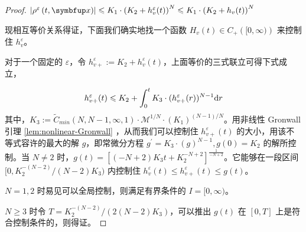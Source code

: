 \begin{proof}
        $\left| \rho^{\varepsilon} \left(t, \vx \right)\right| \leqslant K_{1} \cdot\left(K_{2}+h_{v}^{\varepsilon}(t)\right)^{N}\leqslant K_{1} \cdot\left(K_{2}+h_{v}(t)\right)^{N}$

现相互等价关系得证，下面我们确实地找一个函数 $H_v(t)\in C_+\left([0,\infty)\right)$ 来控制住 $h_v^\varepsilon$。





对于一个固定的 $\varepsilon$，令 $h_{v+}^\varepsilon:=K_2+h_v^\varepsilon(t)$，上面等价的三式联立可得下式成立，

\begin{equation}
h_{v+}^\varepsilon(t) \leqslant K_{2}+\int_{0}^{t} K_{3} \cdot(h_{v+}^\varepsilon(r))^{N-1} \mathrm{d} r \\
\end{equation}
其中，$K_{3}:=\tilde{C}_{min}(N, N-1, \infty, 1) \cdot \mathcal{M}^{1 / N} \cdot\left(K_{1}\right)^{(N-1) / N}$。用非线性 Gronwall 引理 \ref{lem:nonlinear-Gronwall} ，从而我们可以控制住 $h_{v+}^\varepsilon(t) $ 的大小，用该不等式容许的最大的解 $g$，即常微分方程 $g^{\prime}=K_{3} \cdot(g)^{N-1}, g(0)=K_{2}$ 的解所控制。当 $N\neq 2$ 时，$g(t) = [(-N+2)K_3 t+K_2^{-N+2}]^{\frac{1}{-N+2}}$。它能够在一段区间 $[0, K_2^{-(N-2)}/(N-2)K_3)$ 内控制住 $h_{v}^\varepsilon(t) \leqslant h_{v+}^\varepsilon(t) \leqslant g(t)$。  

$N=1,2$ 时易见可以全局控制，则满足有界条件的 $I=[0, \infty)$。

$N \geqslant 3$ 时令 $T=K_2^{-(N-2)}/(2(N-2)K_3)$，可以推出 $g(t)$ 在 $[0, T]$ 上是符合控制条件的，则得证。

\end{proof}


